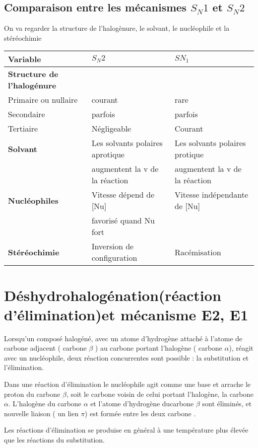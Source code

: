 \subsection{ Comparaison entre les mécanismes $S_N1$ et $S_N2$}

On va regarder la structure de l'halogènure, le solvant, le nucléophile et la stéréochimie


\begin{tabular}{|l|l|l|}
  \hline
  Variable & $S_N2$ & $SN_1$ \\
  \hline
  \textbf{Structure de l'halogénure} & & \\
  Primaire ou nullaire & courant & rare \\
  Secondaire & parfois & parfois  \\
  Tertiaire & Négligeable & Courant \\
  \hline
  \textbf{Solvant} & Les solvants polaires aprotique & Les solvants polaires protique \\
                   & augmentent la v de la réaction & augmentent la v de la réaction  \\
  \hline
  \textbf{Nucléophiles} & Vitesse dépend de [Nu] 	& Vitesse indépendante de [Nu]\\
                         & favorisé quand Nu fort & \\
  \hline
  \textbf{Stéréochimie} & Inversion de configuration & Racémisation \\
  \hline
\end{tabular}


\section{Déshydrohalogénation(réaction d'élimination)et mécanisme E2, E1}

Lorsqu'un composé halogéné, avec un atome d'hydrogène attaché à l'atome de carbone adjacent ( carbone $\beta$ ) au carbone portant l'halogène ( carbone $\alpha$), réagit avec un nucléophile, deux réaction concurrentes sont possible : la substitution et l'élimination.

Dans une réaction d'élimination le nucléophile agit comme une base et arrache le proton du carbone $\beta$, soit le carbone voisin de celui portant l'halogène, la carbone $\alpha$.
L'halogène du  carbone $\alpha$ et l'atome d'hydrogène ducarbone $\beta$ sont éliminés, et nouvelle liaison ( un lien $\pi$) est formée entre les deux carbone .

Les réactions d'élimination se produise en général à une température plus élevée que les réactions du substitution.

